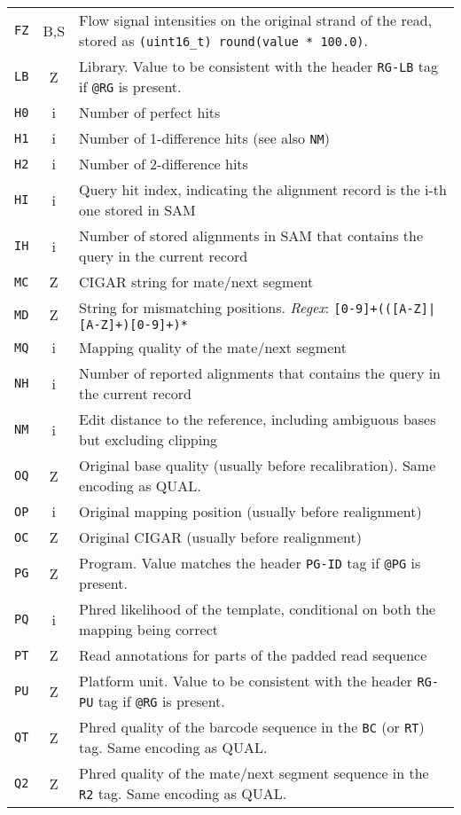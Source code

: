 \documentclass[10pt]{article}
\begin{document}
\begin{center}
\begin{longtable}{ccp{12.5cm}}
  {\tt FZ} & B,S & Flow signal intensities on the original strand of the read, stored as {\tt (uint16\_t) round(value * 100.0)}. \\
  {\tt LB} & Z & Library. Value to be consistent with the header {\tt RG-LB} tag if {\tt @RG} is present.\\
  {\tt H0} & i & Number of perfect hits\\
  {\tt H1} & i & Number of 1-difference hits (see also {\tt NM})\\
  {\tt H2} & i & Number of 2-difference hits \\
  {\tt HI} & i & Query hit index, indicating the alignment record is the i-th one stored in SAM\\
  {\tt IH} & i & Number of stored alignments in SAM that contains the query in the current record\\
  {\tt MC} & Z & CIGAR string for mate/next segment\\
  {\tt MD} & Z & String for mismatching positions. \emph{Regex}: {\tt [0-9]+(([A-Z]|\char92\char94[A-Z]+)[0-9]+)*}\footnotemark\\
  {\tt MQ} & i & Mapping quality of the mate/next segment \\
  {\tt NH} & i & Number of reported alignments that contains the query in the current record\\
  {\tt NM} & i & Edit distance to the reference, including ambiguous bases but excluding clipping\\
  {\tt OQ} & Z & Original base quality (usually before recalibration). Same encoding as {\sf QUAL}.\\
  {\tt OP} & i & Original mapping position (usually before realignment) \\
  {\tt OC} & Z & Original CIGAR (usually before realignment) \\
  {\tt PG} & Z & Program. Value matches the header {\tt PG-ID} tag if {\tt @PG} is present. \\
  {\tt PQ} & i & Phred likelihood of the template, conditional on both the mapping being correct \\
  {\tt PT} & Z & Read annotations for parts of the padded read sequence\footnotemark\\
  {\tt PU} & Z & Platform unit. Value to be consistent with the header {\tt RG-PU} tag if {\tt @RG} is present.\\
  {\tt QT} & Z & Phred quality of the barcode sequence in the {\tt BC} (or {\tt RT}) tag. Same encoding as {\sf QUAL}. \\
  {\tt Q2} & Z & Phred quality of the mate/next segment sequence in the {\tt R2} tag. Same encoding as {\sf QUAL}.\\

\end{longtable}
\end{center}
\end{document}
